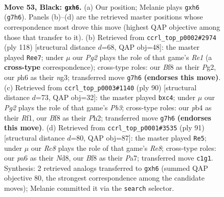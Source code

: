 \documentclass[11pt]{article}
\begin{document}
\clearpage

\begin{figure}[p]\centering
\begin{subfigure}{0.46\textwidth}\centering
\resizebox{\linewidth}{!}{%
\newchessgame
\chessboard[
  setfen={5bn1/p5pk/P6P/1p3p2/1P3P1K/4P3/1Rb5/RNr5 b - - 2 53},
  showmover=false,
  pgfstyle=straightmove, color=movearrow, markmove={g7-h6}
]}
\caption{}
\end{subfigure}\hfill
\begin{subfigure}{0.46\textwidth}\centering
\resizebox{\linewidth}{!}{%
\newchessgame
\chessboard[
  setfen={8/1R6/2Br3k/1p3p2/p4P1p/Pr4nP/6PK/4R3 w - - 29 60},
  showmover=false,
  pgfstyle=straightmove, color=movearrow, markmove={e1-e7}
]}
\caption{}
\end{subfigure}
\\[4pt]
\begin{subfigure}{0.46\textwidth}\centering
\resizebox{\linewidth}{!}{%
\newchessgame
\chessboard[
  setfen={2r2k2/5p2/2n1p2p/pB6/P1p3P1/1P2K3/7P/5R2 w - - 0 46},
  showmover=false,
  pgfstyle=straightmove, color=movearrow, markmove={b3-c4}
]}
\caption{}
\end{subfigure}\hfill
\begin{subfigure}{0.46\textwidth}\centering
\resizebox{\linewidth}{!}{%
\newchessgame
\chessboard[
  setfen={3n3k/p1p2p1p/2P2r2/1p1P1b2/5R2/3B4/P5R1/4rNK1 b - - 3 46},
  showmover=false,
  pgfstyle=straightmove, color=movearrow, markmove={e1-e5}
]}
\caption{}
\end{subfigure}
\caption{\textbf{Move 53, Black: \texttt{gxh6}.} (a) Our position; Melanie plays \texttt{gxh6} (\texttt{g7h6}). Panels (b)--(d) are the retrieved master positions whose correspondence most drove this move (highest QAP objective among those that transfer to it). (b) Retrieved from \texttt{ccrl\_top\_p0002\#2974} (ply 118) [structural distance $d$=68, QAP obj=48]: the master played \texttt{Ree7}; under $\mu$ our \emph{Pg2} plays the role of that game's \emph{Re1} (a \textbf{cross-type} correspondence); cross-type roles: our \emph{B}f8 as their \emph{P}g2, our \emph{p}h6 as their \emph{n}g3; transferred move \texttt{g7h6} \textbf{(endorses this move)}. (c) Retrieved from \texttt{ccrl\_top\_p0003\#1140} (ply 90) [structural distance $d$=73, QAP obj=32]: the master played \texttt{bxc4}; under $\mu$ our \emph{Pg2} plays the role of that game's \emph{Pb3}; cross-type roles: our \emph{p}b4 as their \emph{R}f1, our \emph{B}f8 as their \emph{P}h2; transferred move \texttt{g7h6} \textbf{(endorses this move)}. (d) Retrieved from \texttt{ccrl\_top\_p0001\#3535} (ply 91) [structural distance $d$=80, QAP obj=87]: the master played \texttt{Re5}; under $\mu$ our \emph{Rc8} plays the role of that game's \emph{Re8}; cross-type roles: our \emph{p}a6 as their \emph{N}d8, our \emph{B}f8 as their \emph{P}a7; transferred move \texttt{c1g1}. Synthesis: 2 retrieved analogs transferred to \texttt{gxh6} (summed QAP objective 80, the strongest correspondence among the candidate moves); Melanie committed it via the \texttt{search} selector.}
\label{fig:thought-m105}
\end{figure}
\end{document}
